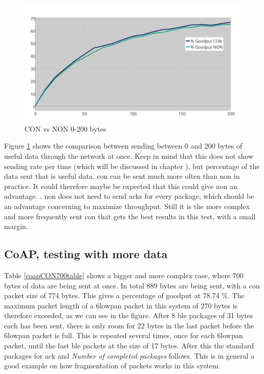 



\begin{figure}[ht]
    \centering
    \includegraphics[scale=1.0]{CONvsNONplot_0-200_thickerGRAY.png}    
    \caption{CON vs NON 0-200 bytes}
    \label{fig:CONvsNON0-200}
\end{figure}

Figure \ref{fig:CONvsNON0-200} shows the comparison between sending between 0 and 200 bytes of useful data through the network at once. Keep in mind that this does not show sending rate per time (which will be discussed in chapter ), but percentage of the data sent that is useful data. \gls{con} can be sent much more often than \gls{non} in practice. It could therefore maybe be expected that this could give \gls{non} an advantage. . \gls{non} does not need to send \glspl{ack} for every package, which should be an advantage concerning to maximize throughput. Still it is the more complex and more frequently sent \gls{con} that gets the best results in this test, with a small margin. 


\subsection{CoAP, testing with more data}

Table \ref{coapCON700table} shows a bigger and more complex case, where 700 bytes of data are being sent at once. In total 889 bytes are being sent, with a \gls{con} packet size of 774 bytes. This gives a percentage of goodput at 78.74 \%. The maximum packet length of a \gls{6lowpan} packet in this system of 270 bytes is therefore exceeded, as we can see in the figure. After 8 \gls{ble} packages of 31 bytes each has been sent, there is only room for 22 bytes in the last packet before the \gls{6lowpan} packet is full. This is repeated several times, once for each \gls{6lowpan} packet, until the last \gls{ble} packets at the size of 17 bytes. After this the standard packages for \gls{ack} and \textit{Number of completed packages} follows. This is in general a good example on how fragmentation of packets works in this system. 


